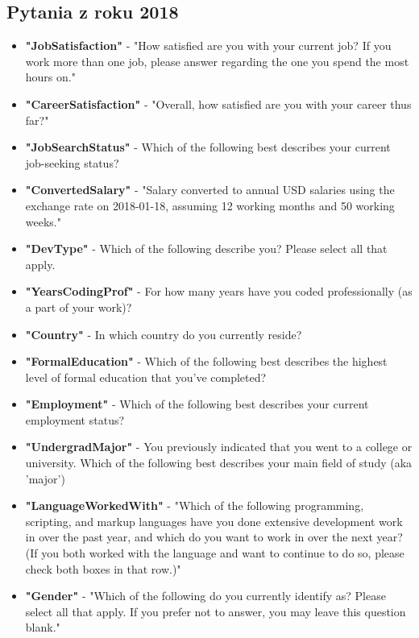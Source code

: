 \begin{appendices}
    \section{Pytania z roku 2018}\label{pytania-2018}

    \begin{itemize}
        \item \textbf{"JobSatisfaction"} - "How satisfied are you with your current job? If you work more than one job, please answer regarding the one you spend the most hours on."
        \item \textbf{"CareerSatisfaction"} - "Overall, how satisfied are you with your career thus far?"
        \item \textbf{"JobSearchStatus"} - Which of the following best describes your current job-seeking status?
        \item \textbf{"ConvertedSalary"} - "Salary converted to annual USD salaries using the exchange rate on 2018-01-18, assuming 12 working months and 50 working weeks."
        \item \textbf{"DevType"} - Which of the following describe you? Please select all that apply.
        \item \textbf{"YearsCodingProf"} - For how many years have you coded professionally (as a part of your work)?
        \item \textbf{"Country"} - In which country do you currently reside?
        \item \textbf{"FormalEducation"} - Which of the following best describes the highest level of formal education that you’ve completed?
        \item \textbf{"Employment"} - Which of the following best describes your current employment status?
        \item \textbf{"UndergradMajor"} - You previously indicated that you went to a college or university. Which of the following best describes your main field of study (aka 'major')
        \item \textbf{"LanguageWorkedWith"} - "Which of the following programming, scripting, and markup languages have you done extensive development work in over the past year, and which do you want to work in over the next year?  (If you both worked with the language and want to continue to do so, please check both boxes in that row.)"
        \item \textbf{"Gender"} - "Which of the following do you currently identify as? Please select all that apply. If you prefer not to answer, you may leave this question blank."

\end{itemize}
\end{appendices}
